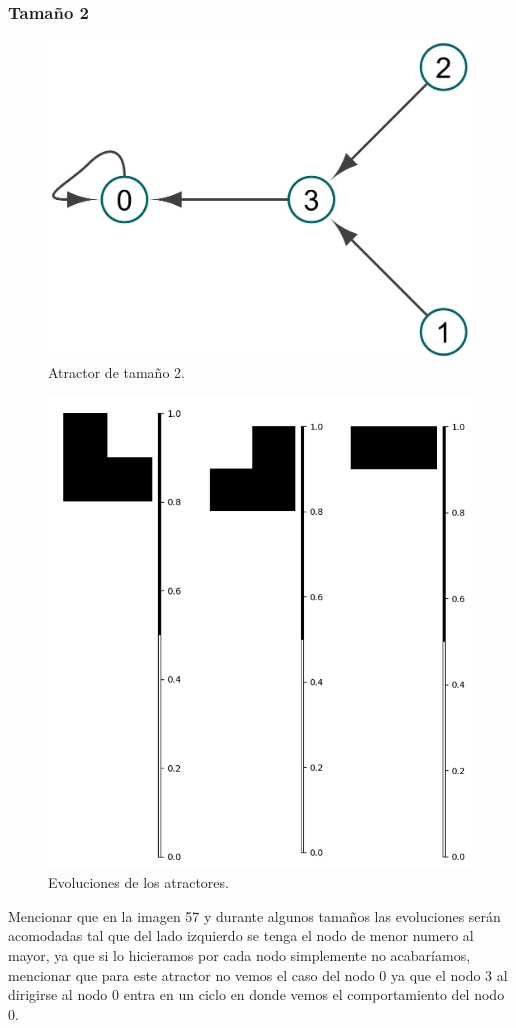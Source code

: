 \documentclass[11pt]{article}
\begin{document}
			\subsubsection{Tamaño 2}
			\begin{figure}[H]
			\centering
			\includegraphics[scale=0.05]{resources/Atractores54/atractor_54_size_2.png}
			\caption{Atractor de tamaño 2.}\label{fig:picture}
			\end{figure}
			\begin{figure}[H]
			\centering
			\includegraphics[scale=0.5]{resources/Atractores54/atractor_54_size_2_res.png}
			\caption{Evoluciones de los atractores.}\label{fig:picture}
			\end{figure}
			Mencionar que en la imagen 57 y durante algunos tamaños las evoluciones serán acomodadas tal que del lado izquierdo se tenga el nodo de menor numero al mayor, ya que si lo hicieramos por cada nodo simplemente no acabaríamos, mencionar que para este atractor no vemos el caso del nodo 0 ya que el nodo 3 al dirigirse al nodo 0 entra en un ciclo en donde vemos el comportamiento del nodo 0.
\end{document}
